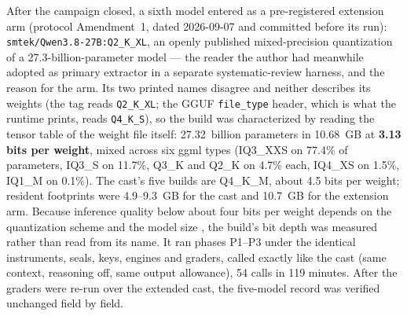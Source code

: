 \documentclass[11pt]{article}
\begin{document}
After the campaign closed, a sixth model entered as a pre-registered extension arm (protocol Amendment~1, dated 2026-09-07 and committed before its run): \texttt{smtek/Qwen3.8-27B:Q2\_K\_XL}, an openly published mixed-precision quantization of a 27.3-billion-parameter model --- the reader the author had meanwhile adopted as primary extractor in a separate systematic-review harness, and the reason for the arm. Its two printed names disagree and neither describes its weights (the tag reads \texttt{Q2\_K\_XL}; the GGUF \texttt{file\_type} header, which is what the runtime prints, reads \texttt{Q4\_K\_S}), so the build was characterized by reading the tensor table of the weight file itself: 27.32~billion parameters in 10.68~GB at \textbf{3.13 bits per weight}, mixed across six ggml types (IQ3\_XXS on 77.4\% of parameters, IQ3\_S on 11.7\%, Q3\_K and Q2\_K on 4.7\% each, IQ4\_XS on 1.5\%, IQ1\_M on 0.1\%). The cast's five builds are Q4\_K\_M, about 4.5 bits per weight; resident footprints were 4.9--9.3~GB for the cast and 10.7~GB for the extension arm. Because inference quality below about four bits per weight depends on the quantization scheme and the model size \citep{dettmers2023fourbit}, the build's bit depth was measured rather than read from its name. It ran phases P1--P3 under the identical instruments, seals, keys, engines and graders, called exactly like the cast (same context, reasoning off, same output allowance), 54 calls in 119 minutes. After the graders were re-run over the extended cast, the five-model record was verified unchanged field by field.
\end{document}
